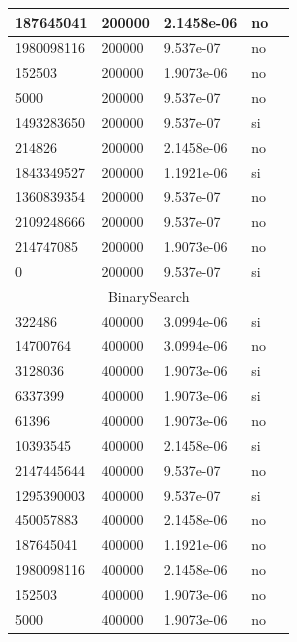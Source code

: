 \documentclass[12pt, fleqn]{article}                             %
\theoremstyle{break}                                            %
\begin{document}
\begin{longtable}{|m{5em}|m{5em}|m{10em}|m{5em}|@{}m{0pt}@{}}
            187645041& 200000  & 2.1458e-06 & no &\\[1em]    \hline
            1980098116& 200000  & 9.537e-07 & no &\\[1em]    \hline
            152503& 200000  & 1.9073e-06 & no &\\[1em]    \hline
            5000& 200000  & 9.537e-07 & no &\\[1em]    \hline
            1493283650& 200000  & 9.537e-07 & si &\\[1em]    \hline
            214826& 200000  & 2.1458e-06 & no &\\[1em]    \hline
            1843349527& 200000  & 1.1921e-06 & si &\\[1em]    \hline
            1360839354& 200000  & 9.537e-07 & no &\\[1em]    \hline
            2109248666& 200000  & 9.537e-07 & no &\\[1em]    \hline
            214747085& 200000  & 1.9073e-06 & no &\\[1em]    \hline
            0& 200000  & 9.537e-07 & si &\\[1em]    \hline
            \multicolumn{5}{|c|}{BinarySearch}   \\          \hline
            322486& 400000  & 3.0994e-06 & si &\\[1em]    \hline
            14700764& 400000  & 3.0994e-06 & no &\\[1em]    \hline
            3128036& 400000  & 1.9073e-06 & si &\\[1em]    \hline
            6337399& 400000  & 1.9073e-06 & si &\\[1em]    \hline
            61396& 400000  & 1.9073e-06 & no &\\[1em]    \hline
            10393545& 400000  & 2.1458e-06 & si &\\[1em]    \hline
            2147445644& 400000  & 9.537e-07 & no &\\[1em]    \hline
            1295390003& 400000  & 9.537e-07 & si &\\[1em]    \hline
            450057883& 400000  & 2.1458e-06 & no &\\[1em]    \hline
            187645041& 400000  & 1.1921e-06 & no &\\[1em]    \hline
            1980098116& 400000  & 2.1458e-06 & no &\\[1em]    \hline
            152503& 400000  & 1.9073e-06 & no &\\[1em]    \hline
            5000& 400000  & 1.9073e-06 & no &\\[1em]    \hline

\end{longtable}
\end{document}
